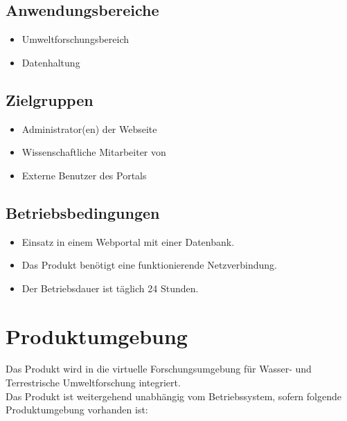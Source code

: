 \documentclass[parskip=full,11pt]{scrartcl}
\begin{document}
\subsection{Anwendungsbereiche}
\begin{itemize}[itemsep=0pt]
\item Umweltforschungsbereich
\item Datenhaltung
\end{itemize}

\subsection{Zielgruppen}
\begin{itemize}[itemsep=0pt]
\item Administrator(en) der Webseite %
\item Wissenschaftliche Mitarbeiter von \grqq
\item Externe Benutzer des Portals
\end{itemize}

\subsection{Betriebsbedingungen}
\begin{itemize}[itemsep=0pt]
\item Einsatz in einem Webportal mit einer \gls{Datenbank}.
\item Das Produkt benötigt eine funktionierende Netzverbindung.
\item Der Betriebsdauer ist täglich 24 Stunden.
\end{itemize}


\section{Produktumgebung}
Das Produkt wird in die virtuelle Forschungsumgebung für Wasser- und Terrestrische Umweltforschung \grqq integriert.\\
Das Produkt ist weitergehend unabhängig vom Betriebssystem, sofern folgende Produktumgebung vorhanden ist:
\end{document}
